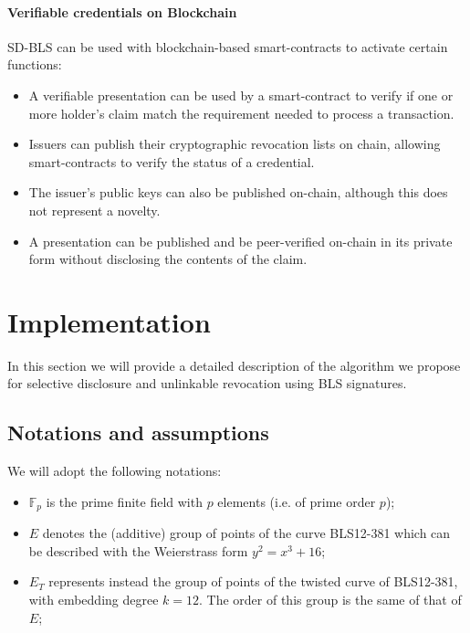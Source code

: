 \paragraph{Verifiable credentials on Blockchain}
SD-BLS can be used with blockchain-based smart-contracts to activate
certain functions:
\begin{itemize}
    \item A verifiable presentation can be used by a smart-contract to
      verify if one or more holder's claim match the requirement
      needed to process a transaction.
    \item Issuers can publish their cryptographic revocation lists on
      chain, allowing smart-contracts to verify the status of a
      credential.
    \item The issuer's public keys can also be published on-chain,
      although this does not represent a novelty.
    \item A presentation can be published and be peer-verified
      on-chain in its private form without disclosing the contents of
      the claim.
\end{itemize}

\section{Implementation}

In this section we will provide a detailed description of the
algorithm we propose for selective disclosure and unlinkable
revocation using BLS signatures.

\subsection{Notations and assumptions}

We will adopt the following notations:
\begin{itemize}

\item $\mathbb{F}_p$ is the prime finite field with $p$ elements
  (i.e. of prime order $p$);

\item $E$ denotes the (additive) group of points of the curve
  BLS12-381 \cite{bls381-12} which can be described with the
  Weierstrass form $y^2=x^3 + 16$;

\item $E_T$ represents instead the group of points of the twisted
  curve of BLS12-381, with embedding degree $k=12$. The order of
  this group is the same of that of $E$;

\end{itemize}

